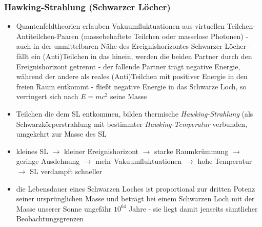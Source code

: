 \documentclass{beamer}
\begin{document}
\begin{frame}\frametitle{Hawking-Strahlung (Schwarzer Löcher)}

{\fontsize{10}{10} \selectfont

\begin{itemize}

\item Quantenfeldtheorien erlauben Vakuumfluktuationen aus virtuellen Teilchen-Antiteilchen-Paaren (massebehaftete Teilchen oder masselose Photonen) - auch in der unmittelbaren Nähe des Ereignishorizontes Schwarzer Löcher - fällt ein (Anti)Teilchen in das hinein, werden die beiden Partner durch den Ereignishorizont getrennt - der fallende Partner trägt negative Energie, während der andere als reales (Anti)Teilchen mit positiver Energie in den freien Raum entkommt - fließt negative Energie in das Schwarze Loch, so verringert sich nach $E=mc^2$ seine Masse

\item Teilchen die dem SL entkommen, bilden thermische \textit{Hawking-Strahlung} (als Schwarzkörperstrahlung mit bestimmter \textit{Hawking-Temperatur} verbunden, umgekehrt zur Masse des SL

\item kleines SL $\to$ kleiner Ereignishorizont $\to$ starke Raumkrümmung $\to$ geringe Ausdehnung $\to$ mehr Vakuumfluktuationen $\to$ hohe Temperatur $\to$ SL verdampft schneller

\item die Lebensdauer eines Schwarzen Loches ist proportional zur dritten Potenz seiner ursprünglichen Masse und beträgt bei einem Schwarzen Loch mit der Masse unserer Sonne ungefähr $10^{64}$ Jahre - sie liegt damit jenseits sämtlicher Beobachtungsgrenzen

\end{itemize}

}

\end{frame}
\end{document}
